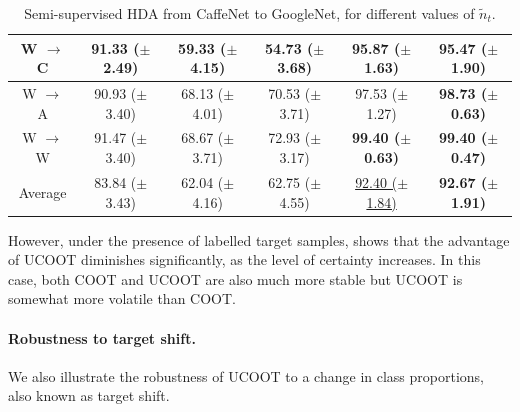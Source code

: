 \begin{table}[t]
\begin{tabular}{c c c c c c}
    W $\to$ C & 91.33 ($\pm$ 2.49) & 59.33 ($\pm$ 4.15) & 54.73 ($\pm$ 3.68) & \textbf{95.87 ($\pm$ 1.63)} & 95.47 ($\pm$ 1.90) \\
    \hline
    W $\to$ A & 90.93 ($\pm$ 3.40) & 68.13 ($\pm$ 4.01) & 70.53 ($\pm$ 3.71) & 97.53 ($\pm$ 1.27) & \textbf{98.73 ($\pm$ 0.63)} \\
    \hline
    W $\to$ W & 91.47 ($\pm$ 3.40) & 68.67 ($\pm$ 3.71) & 72.93 ($\pm$ 3.17) & \textbf{99.40 ($\pm$ 0.63)} & \textbf{99.40 ($\pm$ 0.47)} \\
    \bottomrule
    Average & 83.84 ($\pm$ 3.43) & 62.04 ($\pm$ 4.16) & 62.75 ($\pm$ 4.55) & \underline{92.40 ($\pm$ 1.84)} & \textbf{92.67 ($\pm$ 1.91)} \\
    \bottomrule
  \end{tabular}
  \caption{Semi-supervised HDA from CaffeNet to GoogleNet, for different values of $\tilde{n}_t$.}
  \label{tab:table2}
\end{table}
However, under the presence of
labelled target samples,  shows that the advantage of UCOOT diminishes significantly,
as the level of certainty increases. In this case, both COOT and UCOOT
are also much more stable but UCOOT is somewhat more volatile than COOT.

\newpage
\paragraph{Robustness to target shift.}
We also illustrate the robustness of UCOOT to a change in class proportions,
also known as target shift.

